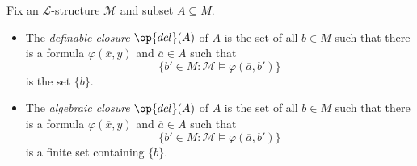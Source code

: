 \documentclass{article}
\begin{document}
\begin{definition}
	Fix an $\mathcal L$-structure $\mathcal M$ and subset $A\subseteq M$.
	\begin{itemize}
		\item The \textit{definable closure} $\op{dcl}(A)$ of $A$ is the set of all $b\in M$ such that there is a formula $\varphi(\overline x,y)$ and $\overline a\in A$ such that
		\[\{b'\in M:\mathcal M\models\varphi(\overline a,b')\}\]
		is the set $\{b\}$.
		\item The \textit{algebraic closure} $\op{dcl}(A)$ of $A$ is the set of all $b\in M$ such that there is a formula $\varphi(\overline x,y)$ and $\overline a\in A$ such that
		\[\{b'\in M:\mathcal M\models\varphi(\overline a,b')\}\]
		is a finite set containing $\{b\}$.
	\end{itemize}
\end{definition}
\end{document}
